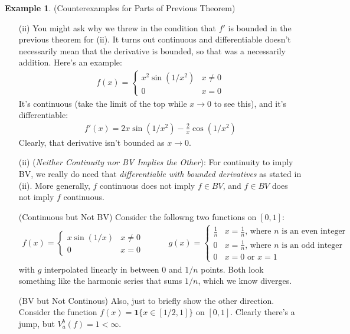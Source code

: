 \documentclass[12pt]{article}
\numberwithin{equation}{section} %
\theoremstyle{plain}
\theoremstyle{definition}
\newtheorem{ex}[thm]{Example}
\theoremstyle{remark}
\begin{document}
\begin{ex}(Counterexamples for Parts of Previous Theorem)
\begin{enumerate}[label=(\roman*)]
  \item[(ii)]
    You might ask why we threw in the condition that $f'$ is bounded in
    the previous theorem for (ii).  It turns out continuous and
    differentiable doesn't necessarily mean that the derivative is
    bounded, so that was a necessarily addition.  Here's an example:
    \begin{align*}
        f(x) =
        \begin{cases}
            x^2 \sin(1/x^2) & x \neq 0\\
            0               & x = 0
        \end{cases}
    \end{align*}
    It's continuous (take the limit of the top while $x\rightarrow 0$ to
    see this), and it's differentiable:
    \begin{align*}
      f'(x) = 2x \sin(1/x^2) - \frac{2}{x} \cos(1/x^2)
    \end{align*}
    Clearly, that derivative isn't bounded as $x\rightarrow 0$.

  \item[(ii)]
    (\emph{Neither Continuity nor BV Implies the Other}):
    For continuity to imply BV, we really do need that
    \emph{differentiable with bounded derivatives} as stated in (ii).
    More generally, $f$ continuous does not imply $f\in BV$, and $f \in
    BV$ does not imply $f$ continuous.

    (Continuous but Not BV)
    Consider the followng two functions on $[0,1]$:
    \begin{align*}
        f(x) =
            \begin{cases}
                x \sin(1/x) & x\neq 0 \\
                0 & x=0
            \end{cases}
        \qquad\quad
        g(x) =
        \begin{cases}
        \frac{1}{n} & \text{$x = \frac{1}{n}$, where $n$ is an even integer}\\
        0 & \text{$x = \frac{1}{n}$, where $n$ is an odd integer} \\
        0 & \text{$x = 0$ or $x = 1$}
        \end{cases}
    \end{align*}
    with $g$ interpolated linearly in between $0$ and $1/n$ points.
    Both look something like the harmonic series that sums $1/n$, which we
    know diverges.

    (BV but Not Continous)
    Also, just to briefly show the other direction.
    Consider the function $f(x)=\mathbf{1}\{x\in[1/2,1]\}$ on $[0,1]$.
    Clearly there's a jump, but $V_a^b(f) = 1 < \infty$.
\end{enumerate}
\end{ex}
\end{document}
